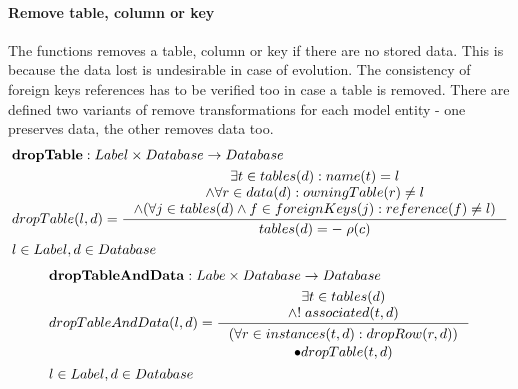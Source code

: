 \documentclass[11pt]{article}
\begin{document}
\paragraph{Remove table, column or key} The functions removes a table, column or key if there are no stored data. This is because the data lost is undesirable in case of evolution. The consistency of foreign keys references has to be verified too in case a table is removed.  There are defined two variants of remove transformations for each model entity - one preserves data, the other removes data too.
\begin{align*}
&	\mathbf{dropTable} : Label \times Database \rightarrow Database \\
&	dropTable(l,d) = \inference{ \exists t \in tables(d) : name(t) = l  \\ \wedge \forall r \in data(d) : owningTable(r) \neq l \\  \wedge (\forall j \in tables(d) \wedge f \in foreignKeys(j) : reference(f) \neq l) }{ tables(d) =- \; \rho(c)}\\
& l \in Label, d \in Database
\end{align*}
\begin{align*}
&	\mathbf{dropTableAndData} : Labe \times Database \rightarrow Database \\
&	dropTableAndData(l, d) = \inference{\exists t \in tables(d) \\ \wedge ! \; associated(t, d)}{\begin{gathered}
	(\forall r \in instances(t,d) : dropRow(r, d))\\ \bullet dropTable(t,d)
\end{gathered}}
	\\& l \in Label, d \in Database
\end{align*}
\end{document}
